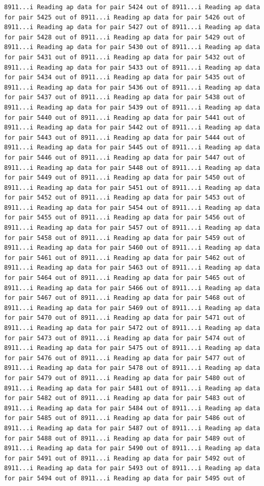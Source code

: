 \documentclass[
]{article}
\begin{document}
\begin{verbatim}
8911...i Reading ap data for pair 5424 out of 8911...i Reading ap data for pair 5425 out of 8911...i Reading ap data for pair 5426 out of 8911...i Reading ap data for pair 5427 out of 8911...i Reading ap data for pair 5428 out of 8911...i Reading ap data for pair 5429 out of 8911...i Reading ap data for pair 5430 out of 8911...i Reading ap data for pair 5431 out of 8911...i Reading ap data for pair 5432 out of 8911...i Reading ap data for pair 5433 out of 8911...i Reading ap data for pair 5434 out of 8911...i Reading ap data for pair 5435 out of 8911...i Reading ap data for pair 5436 out of 8911...i Reading ap data for pair 5437 out of 8911...i Reading ap data for pair 5438 out of 8911...i Reading ap data for pair 5439 out of 8911...i Reading ap data for pair 5440 out of 8911...i Reading ap data for pair 5441 out of 8911...i Reading ap data for pair 5442 out of 8911...i Reading ap data for pair 5443 out of 8911...i Reading ap data for pair 5444 out of 8911...i Reading ap data for pair 5445 out of 8911...i Reading ap data for pair 5446 out of 8911...i Reading ap data for pair 5447 out of 8911...i Reading ap data for pair 5448 out of 8911...i Reading ap data for pair 5449 out of 8911...i Reading ap data for pair 5450 out of 8911...i Reading ap data for pair 5451 out of 8911...i Reading ap data for pair 5452 out of 8911...i Reading ap data for pair 5453 out of 8911...i Reading ap data for pair 5454 out of 8911...i Reading ap data for pair 5455 out of 8911...i Reading ap data for pair 5456 out of 8911...i Reading ap data for pair 5457 out of 8911...i Reading ap data for pair 5458 out of 8911...i Reading ap data for pair 5459 out of 8911...i Reading ap data for pair 5460 out of 8911...i Reading ap data for pair 5461 out of 8911...i Reading ap data for pair 5462 out of 8911...i Reading ap data for pair 5463 out of 8911...i Reading ap data for pair 5464 out of 8911...i Reading ap data for pair 5465 out of 8911...i Reading ap data for pair 5466 out of 8911...i Reading ap data for pair 5467 out of 8911...i Reading ap data for pair 5468 out of 8911...i Reading ap data for pair 5469 out of 8911...i Reading ap data for pair 5470 out of 8911...i Reading ap data for pair 5471 out of 8911...i Reading ap data for pair 5472 out of 8911...i Reading ap data for pair 5473 out of 8911...i Reading ap data for pair 5474 out of 8911...i Reading ap data for pair 5475 out of 8911...i Reading ap data for pair 5476 out of 8911...i Reading ap data for pair 5477 out of 8911...i Reading ap data for pair 5478 out of 8911...i Reading ap data for pair 5479 out of 8911...i Reading ap data for pair 5480 out of 8911...i Reading ap data for pair 5481 out of 8911...i Reading ap data for pair 5482 out of 8911...i Reading ap data for pair 5483 out of 8911...i Reading ap data for pair 5484 out of 8911...i Reading ap data for pair 5485 out of 8911...i Reading ap data for pair 5486 out of 8911...i Reading ap data for pair 5487 out of 8911...i Reading ap data for pair 5488 out of 8911...i Reading ap data for pair 5489 out of 8911...i Reading ap data for pair 5490 out of 8911...i Reading ap data for pair 5491 out of 8911...i Reading ap data for pair 5492 out of 8911...i Reading ap data for pair 5493 out of 8911...i Reading ap data for pair 5494 out of 8911...i Reading ap data for pair 5495 out of 
\end{verbatim}
\end{document}
